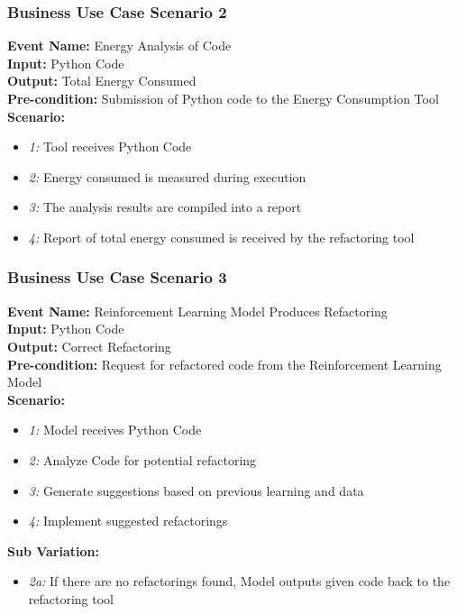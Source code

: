 \documentclass[12pt]{article}
\begin{document}
\subsubsection{Business Use Case Scenario 2} 
\textbf{Event Name:} Energy Analysis of Code \\
\textbf{Input:} Python Code \\
\textbf{Output:} Total Energy Consumed \\
\textbf{Pre-condition:} Submission of Python code to the Energy Consumption Tool \\
\textbf{Scenario: } 
\begin{itemize}
    \item \textit{1:} Tool receives Python Code
    \item \textit{2:} Energy consumed is measured during execution
    \item \textit{3:} The analysis results are compiled into a report
    \item \textit{4:} Report of total energy consumed is received by the refactoring tool
\end{itemize}

\subsubsection{Business Use Case Scenario 3} 
\textbf{Event Name:} Reinforcement Learning Model Produces Refactoring \\
\textbf{Input:} Python Code \\
\textbf{Output:} Correct Refactoring \\
\textbf{Pre-condition:} Request for refactored code from the Reinforcement Learning Model \\
\textbf{Scenario: } 
\begin{itemize}
    \item \textit{1:} Model receives Python Code
    \item \textit{2:} Analyze Code for potential refactoring
    \item \textit{3:} Generate suggestions based on previous learning and data
    \item \textit{4:} Implement suggested refactorings
\end{itemize}
\textbf{Sub Variation: }
\begin{itemize}
    \item \textit{2a:} If there are no refactorings found, Model outputs given code back to the refactoring tool 
\end{itemize}
\end{document}

